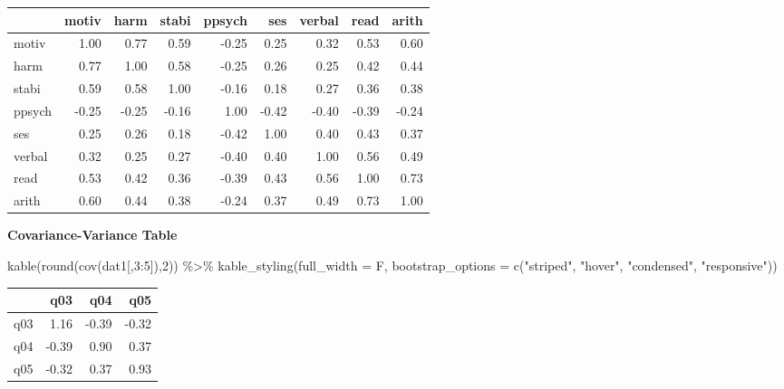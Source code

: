 \documentclass[
]{article}
\newenvironment{Shaded}{\begin{snugshade}}{\end{snugshade}}
\newcommand{\AttributeTok}[1]{\textcolor[rgb]{0.77,0.63,0.00}{#1}}
\newcommand{\DecValTok}[1]{\textcolor[rgb]{0.00,0.00,0.81}{#1}}
\newcommand{\FunctionTok}[1]{\textcolor[rgb]{0.00,0.00,0.00}{#1}}
\newcommand{\NormalTok}[1]{#1}
\newcommand{\SpecialCharTok}[1]{\textcolor[rgb]{0.00,0.00,0.00}{#1}}
\newcommand{\StringTok}[1]{\textcolor[rgb]{0.31,0.60,0.02}{#1}}
\begin{document}
\begin{table}
\centering
\begin{tabular}{l|r|r|r|r|r|r|r|r}
\hline
  & motiv & harm & stabi & ppsych & ses & verbal & read & arith\\
\hline
motiv & 1.00 & 0.77 & 0.59 & -0.25 & 0.25 & 0.32 & 0.53 & 0.60\\
\hline
harm & 0.77 & 1.00 & 0.58 & -0.25 & 0.26 & 0.25 & 0.42 & 0.44\\
\hline
stabi & 0.59 & 0.58 & 1.00 & -0.16 & 0.18 & 0.27 & 0.36 & 0.38\\
\hline
ppsych & -0.25 & -0.25 & -0.16 & 1.00 & -0.42 & -0.40 & -0.39 & -0.24\\
\hline
ses & 0.25 & 0.26 & 0.18 & -0.42 & 1.00 & 0.40 & 0.43 & 0.37\\
\hline
verbal & 0.32 & 0.25 & 0.27 & -0.40 & 0.40 & 1.00 & 0.56 & 0.49\\
\hline
read & 0.53 & 0.42 & 0.36 & -0.39 & 0.43 & 0.56 & 1.00 & 0.73\\
\hline
arith & 0.60 & 0.44 & 0.38 & -0.24 & 0.37 & 0.49 & 0.73 & 1.00\\
\hline
\end{tabular}
\end{table}

\textbf{Covariance-Variance Table}

\begin{Shaded}
\begin{Highlighting}[]
\FunctionTok{kable}\NormalTok{(}\FunctionTok{round}\NormalTok{(}\FunctionTok{cov}\NormalTok{(dat1[,}\DecValTok{3}\SpecialCharTok{:}\DecValTok{5}\NormalTok{]),}\DecValTok{2}\NormalTok{)) }\SpecialCharTok{\%\textgreater{}\%}
  \FunctionTok{kable\_styling}\NormalTok{(}\AttributeTok{full\_width =}\NormalTok{ F, }\AttributeTok{bootstrap\_options =} \FunctionTok{c}\NormalTok{(}\StringTok{"striped"}\NormalTok{, }\StringTok{"hover"}\NormalTok{, }\StringTok{"condensed"}\NormalTok{, }\StringTok{"responsive"}\NormalTok{))}
\end{Highlighting}
\end{Shaded}

\begin{table}
\centering
\begin{tabular}{l|r|r|r}
\hline
  & q03 & q04 & q05\\
\hline
q03 & 1.16 & -0.39 & -0.32\\
\hline
q04 & -0.39 & 0.90 & 0.37\\
\hline
q05 & -0.32 & 0.37 & 0.93\\
\hline
\end{tabular}
\end{table}
\end{document}
